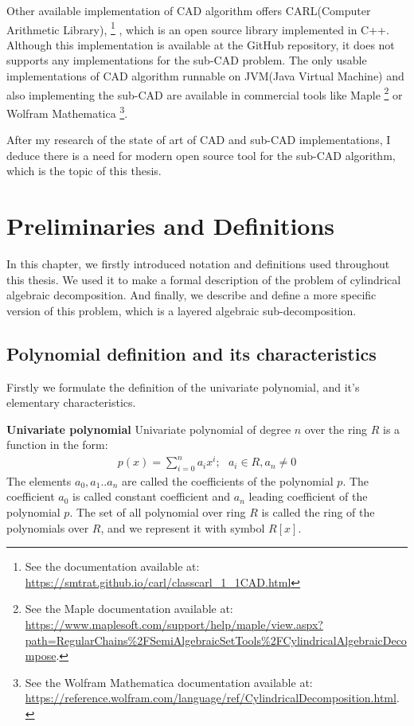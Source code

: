 \documentclass[
  digital, %
  twoside, %
  table,   %
  nolof,     %
  nolot,     %
]{fithesis3}
\begin{document}
Other available implementation of CAD algorithm offers CARL(Computer Arithmetic Library),
\footnote{
  See the documentation available at: \url{https://smtrat.github.io/carl/classcarl_1_1CAD.html}
}
, which is an open source library implemented in C++. Although this implementation is available at the GitHub repository, it does not supports any implementations for the sub-CAD problem.
The only usable implementations of CAD algorithm runnable on JVM(Java Virtual Machine) and also implementing the sub-CAD are available in commercial tools like Maple 
\footnote{
See the Maple documentation available at: \url{https://www.maplesoft.com/support/help/maple/view.aspx?path=RegularChains\%2FSemiAlgebraicSetTools\%2FCylindricalAlgebraicDecompose}.
}
or Wolfram Mathematica 
\footnote{
  See the Wolfram Mathematica documentation available at: \url{https://reference.wolfram.com/language/ref/CylindricalDecomposition.html}.
}.

After my research of the state of art of CAD and sub-CAD implementations, I deduce there is a need for modern open source tool for the sub-CAD algorithm, which is the  topic of this thesis.

\chapter{Preliminaries and Definitions}
In this chapter, we firstly introduced notation and definitions used throughout this thesis. We used it to make a formal description of the problem of cylindrical algebraic decomposition. And finally, we describe and define a more specific version of this problem, which is a layered algebraic sub-decomposition.
\section{Polynomial definition and its characteristics}
Firstly we formulate the definition of the univariate polynomial, and it's elementary characteristics.
\begin{definition}{\textbf{Univariate polynomial}}
\newline
Univariate polynomial of degree $n$ over the ring $R$ is a function in the form:
\begin{align*}
p(x) =  \sum_{i=0}^n a_ix^i;\ \ \  a_i \in R, a_n \neq 0 
\end{align*}
The elements $a_0, a_1 .. a_n$ are called the coefficients of the polynomial $p$. The coefficient $a_0$ is called constant coefficient and $a_n$ leading coefficient of the polynomial $p$.
\newline\newline
The set of all polynomial over ring $R$ is called the ring of the polynomials over $R$, and we represent it with symbol $R[x]$.
\end{definition}
\end{document}
